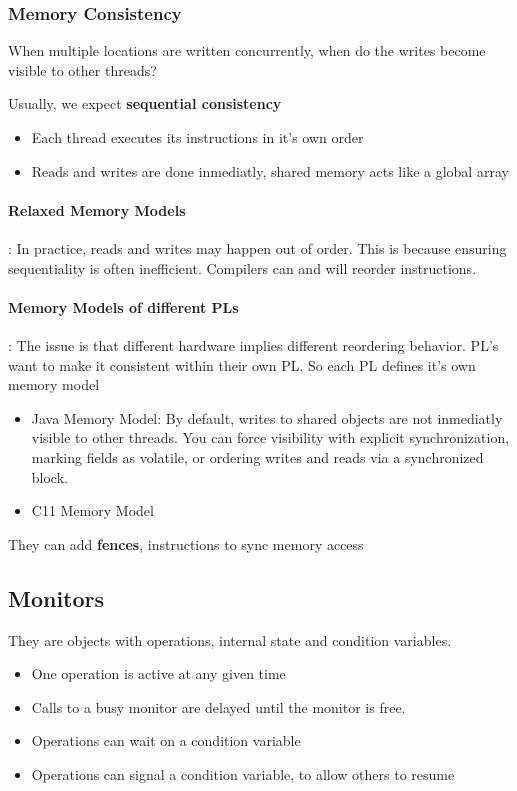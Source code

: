 \documentclass{article}
\begin{document}
\subsubsection{Memory Consistency}
When multiple locations are written concurrently, when do the writes become visible to other threads?

Usually, we expect \textbf{sequential consistency}
\begin{itemize}
  \item Each thread executes its instructions in it's own order
  \item Reads and writes are done inmediatly, shared memory acts like a global array
\end{itemize}
\paragraph{Relaxed Memory Models}: 
In practice, reads and writes may happen out of order. This is because ensuring sequentiality is often inefficient. Compilers can and will reorder instructions.
\paragraph{Memory Models of different PLs}: The issue is that different hardware implies different reordering behavior. PL's want to make it consistent within their own PL. So each PL defines it's own memory model
\begin{itemize}
  \item Java Memory Model: By default, writes to shared objects are not inmediatly visible to other threads. You can force visibility with explicit synchronization, marking fields as volatile, or ordering writes and reads via a synchronized block.
  \item C11 Memory Model
\end{itemize}
They can add \textbf{fences}, instructions to sync memory access
\subsection{Monitors}
They are objects with operations, internal state and condition variables.
\begin{itemize}
  \item One operation is active at any given time
  \item Calls to a busy monitor are delayed until the monitor is free.
  \item Operations can wait on a condition variable
  \item Operations can signal a condition variable, to allow others to resume
\end{itemize}
\end{document}
